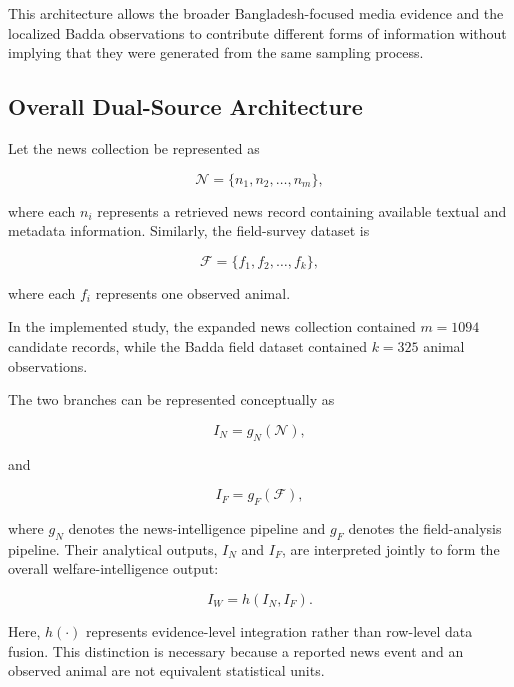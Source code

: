 \documentclass[conference]{IEEEtran}
\begin{document}
This architecture allows the broader Bangladesh-focused media evidence and
the localized Badda observations to contribute different forms of information
without implying that they were generated from the same sampling process.

\subsection{Overall Dual-Source Architecture}

Let the news collection be represented as

\begin{equation}
\mathcal{N} = \{n_1,n_2,\ldots,n_m\},
\end{equation}

where each $n_i$ represents a retrieved news record containing available
textual and metadata information. Similarly, the field-survey dataset is

\begin{equation}
\mathcal{F} = \{f_1,f_2,\ldots,f_k\},
\end{equation}

where each $f_i$ represents one observed animal.

In the implemented study, the expanded news collection contained
$m=1094$ candidate records, while the Badda field dataset contained
$k=325$ animal observations.

The two branches can be represented conceptually as

\begin{equation}
I_N = g_N(\mathcal{N}),
\end{equation}

and

\begin{equation}
I_F = g_F(\mathcal{F}),
\end{equation}

where $g_N$ denotes the news-intelligence pipeline and $g_F$ denotes the
field-analysis pipeline. Their analytical outputs, $I_N$ and $I_F$, are
interpreted jointly to form the overall welfare-intelligence output:

\begin{equation}
I_W = h(I_N,I_F).
\end{equation}

Here, $h(\cdot)$ represents evidence-level integration rather than row-level
data fusion. This distinction is necessary because a reported news event and
an observed animal are not equivalent statistical units.
\end{document}
